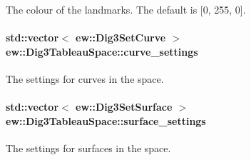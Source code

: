 \label{classew_1_1Dig3TableauSpace_aaa01d6e4fc38104bd38fa7dbd01d4acc}
The colour of the landmarks. The default is \mbox{[}0, 255, 0\mbox{]}. \hypertarget{classew_1_1Dig3TableauSpace_a7b0af5084b9e677080e6c82f63e0cfe8}{
\paragraph[{curve\_\-settings}]{\setlength{\rightskip}{0pt plus 5cm}std::vector$<$ {\bf ew::Dig3SetCurve} $>$ {\bf ew::Dig3TableauSpace::curve\_\-settings}}\hfill}
\label{classew_1_1Dig3TableauSpace_a7b0af5084b9e677080e6c82f63e0cfe8}
The settings for curves in the space. \hypertarget{classew_1_1Dig3TableauSpace_a43e89ab62ea3974fd89e6054d227ecab}{
\paragraph[{surface\_\-settings}]{\setlength{\rightskip}{0pt plus 5cm}std::vector$<$ {\bf ew::Dig3SetSurface} $>$ {\bf ew::Dig3TableauSpace::surface\_\-settings}}\hfill}
\label{classew_1_1Dig3TableauSpace_a43e89ab62ea3974fd89e6054d227ecab}
The settings for surfaces in the space. 